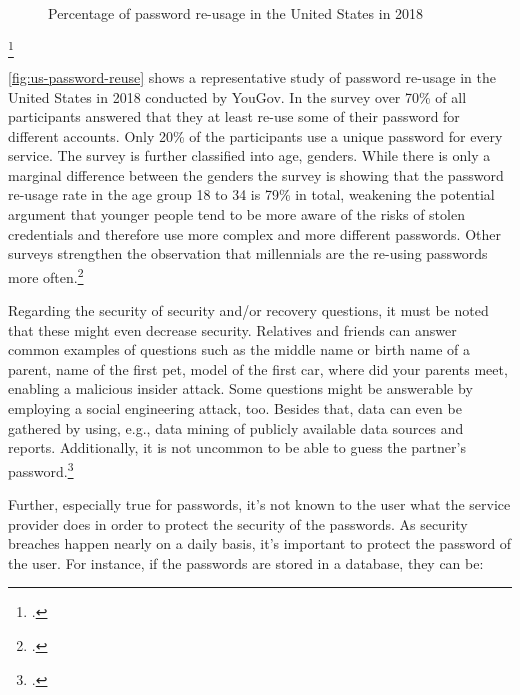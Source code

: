 \begin{figure}[h]
	\begin{bchart}[min=5, max=55, step=10, unit=\%, scale=1.2]
		\medskip
		\medskip
		\bigskip
		\bigskip
	\end{bchart}
	\caption[Percentage of password re-usage in the United States in 2018]{Percentage of password re-usage in the United States in 2018\footnotemark}
	\label{fig:us-password-reuse}
\end{figure}
\footcitetext[Source:][8]{yougov}

\autoref{fig:us-password-reuse} shows a representative study of password re-usage in the United States in 2018 conducted by YouGov. In the survey over 70\% of all participants answered that they at least re-use some of their password for different accounts. Only 20\% of the participants use a unique password for every service. The survey is further classified into age, genders. While there is only a marginal difference between the genders the survey is showing that the password re-usage rate in the age group 18 to 34 is 79\% in total, weakening the potential argument that younger people tend to be more aware of the risks of stolen credentials and therefore use more complex and more different passwords. Other surveys strengthen the observation that millennials are the re-using passwords more often.\footcites[See][10]{ibm-security}[See][8]{yougov}[See][11]{lastpass}[See][1429]{Thomas:2017:DBP:3133956.3134067}

Regarding the security of security and/or recovery questions, it must be noted that these might even decrease security. Relatives and friends can answer common examples of questions such as the \frqq middle name or birth name of a parent, name of the first pet, model of the first car, where did your parents meet\flqq{}, enabling a malicious insider attack. Some questions might be answerable by employing a social engineering attack, too. Besides that, data can even be gathered by using, e.g., data mining of publicly available data sources and reports. Additionally, it is not uncommon to be able to guess the partner's password.\footcites[See][11]{lastpass}[See][169]{Brainard2006}[See][]{Bonneau:2015:SLA:2736277.2741691}[See][5--6]{Rabkin:2008:PKQ:1408664.1408667}

Further, especially true for passwords, it's not known to the user what the service provider does in order to protect the security of the passwords. As security breaches happen nearly on a daily basis, it's important to protect the password of the user. For instance, if the passwords are stored in a database, they can be:

